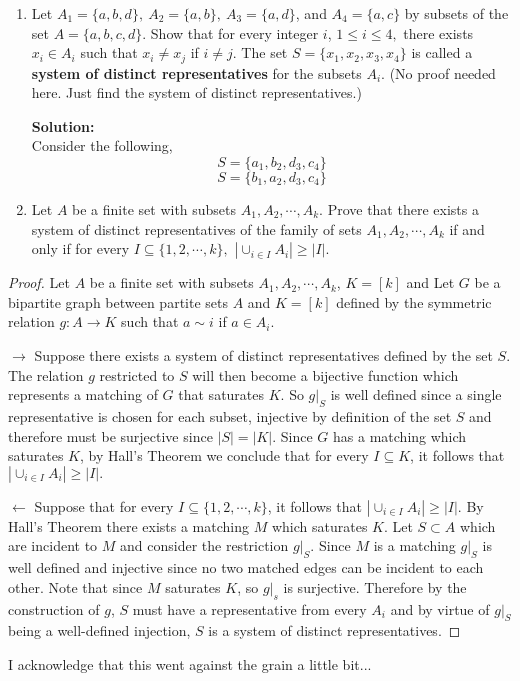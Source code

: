 \documentclass[12pt]{article}
\renewcommand{\emph}[1]{\textsf{\textbf{#1}}}
\newcommand{\localhead}[1]{\par\smallskip\textbf{#1}\nobreak\\}%
\newcommand\solution{\localhead{Solution:}}
\begin{document}
\begin{enumerate}
	\newpage



	\begin{enumerate}
	\item Let $A_1 =\{a,b,d\},\: A_2=\{a,b\}, \: A_3=\{a,d\}$, and $A_4=\{a,c\}$ by subsets of the set $A=\{a,b,c,d\}.$ Show that for every integer $i$, $1 \leq i \leq 4,$ there exists $x_i \in A_i$ such that $x_i \not = x_j$ if $i \not = j.$ The set $S=\{x_1,x_2,x_3,x_4\}$ is called a \emph{system of distinct representatives} for the subsets $A_i.$ (No proof needed here. Just find the system of distinct representatives.)
	\solution Consider the following, 
	\begin{equation*}
		S = \{a_1, b_2, d_3, c_4\}
	\end{equation*}
	\begin{equation*}
		S = \{b_1, a_2, d_3, c_4\}
	\end{equation*}


	\item Let $A$ be a finite set with subsets $A_1, A_2, \cdots, A_k.$ Prove that there exists a system of distinct representatives of the family of sets $A_1, A_2, \cdots, A_k$ if and only if for every $I\subseteq\{1,2,\cdots,k\},$ $\displaystyle{\left\vert \cup_{i \in I} A_i\right\vert \geq |I|.}$
	\end{enumerate}
	\begin{proof} Let $A$ be a finite set with subsets $A_1, A_2, \cdots, A_k$, $K= [k]$ and
		Let $G$ be a bipartite graph between partite sets $A$ and $K = [k]$ defined by the symmetric relation $g: A \to K$ such that $a \sim i$ if $a \in A_i$. 
		
		$\rightarrow$ Suppose there exists a system of distinct representatives defined by the set $S$. The relation $g$ restricted to $S$ will then become a bijective function which represents a matching of $G$ that saturates $K$. So $g|_S$ is well defined since a single representative is chosen for each subset, injective by definition of the set $S$ and therefore must be surjective since $|S| = |K|$. Since $G$ has a matching which saturates $K$, by Hall's Theorem we conclude that for every $I\subseteq K$, it follows that $\displaystyle{\left\vert \cup_{i \in I} A_i\right\vert \geq |I|.}$
		
		

		$\leftarrow$ Suppose that for every $I\subseteq\{1,2,\cdots,k\}$, it follows that $\displaystyle{\left\vert \cup_{i \in I} A_i\right\vert \geq |I|}$. By Hall's Theorem there exists a matching $M$ which saturates $K$. Let $S \subset A$ which are incident to $M$ and consider the restriction $g|_S$. Since $M$ is a matching $g|_S$ is well defined and injective since no two matched edges can be incident to each other. Note that since $M$ saturates $K$, so $g|_s$ is surjective. Therefore by the construction of $g$, $S$ must have a representative from every $A_i$ and by virtue of $g|_S$ being a well-defined injection, $S$ is a system of distinct representatives. 
	\end{proof}
	I acknowledge that this went against the grain a little bit... 



\end{enumerate}
\end{document}

